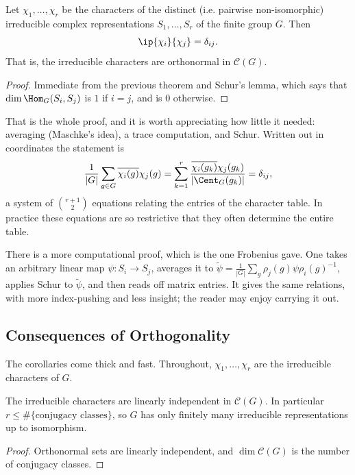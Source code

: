 \begin{theorem}
	Let $\chi_1, \dots, \chi_r$ be the characters of the distinct (i.e. pairwise non-isomorphic) irreducible complex representations $S_1, \dots, S_r$ of the finite group $G$. Then
	$$\ip{\chi_i}{\chi_j} = \delta_{ij}.$$
	That is, the irreducible characters are orthonormal in $\mathcal{C}(G)$.
\end{theorem}
\begin{proof}
	Immediate from the previous theorem and Schur's lemma, which says that $\dim \Hom_G(S_i, S_j)$ is $1$ if $i=j$, and is $0$ otherwise.
\end{proof}

That is the whole proof, and it is worth appreciating how little it needed: averaging (Maschke's idea), a trace computation, and Schur. Written out in coordinates the statement is
$$\frac1{|G|}\sum_{g \in G}\overline{\chi_i(g)}\chi_j(g) = \sum_{k=1}^r \frac{\overline{\chi_i(g_k)}\chi_j(g_k)}{|\Cent_G(g_k)|} = \delta_{ij},$$
a system of $\binom{r+1}{2}$ equations relating the entries of the character table. In practice these equations are so restrictive that they often determine the entire table.

\begin{remark}
	There is a more computational proof, which is the one Frobenius gave. One takes an arbitrary linear map $\psi : S_i \to S_j$, averages it to $\tilde\psi = \frac1{|G|}\sum_g \rho_j(g)\psi\rho_i(g)^{-1}$, applies Schur to $\tilde\psi$, and then reads off matrix entries. It gives the same relations, with more index-pushing and less insight; the reader may enjoy carrying it out.
\end{remark}

\subsection{Consequences of Orthogonality}

The corollaries come thick and fast. Throughout, $\chi_1, \dots, \chi_r$ are the irreducible characters of $G$.

\begin{corollary}
	The irreducible characters are linearly independent in $\mathcal{C}(G)$. In particular $r \leq \#\{\text{conjugacy classes}\}$, so $G$ has only finitely many irreducible representations up to isomorphism.
\end{corollary}
\begin{proof}
	Orthonormal sets are linearly independent, and $\dim\mathcal{C}(G)$ is the number of conjugacy classes.
\end{proof}

